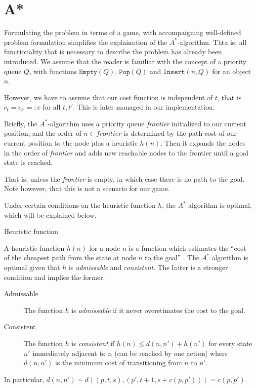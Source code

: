 \section{A*}

Formulating the problem in terms of a game, with accompaigning well-defined problem formulation simplifies the explaination of the $A^*$-algorithm. Thta is, all functionality that is necessary to describe the problem has already been introduced. We assume that the reader is familiar with the concept of a priority queue $Q$, with functions $\texttt{Empty}(Q)$, $\texttt{Pop}(Q)$ and $\texttt{Insert}(n, Q)$ for an object $n$.

However, we have to assume that our cost function is independent of $t$, that is $c_t = c_{t'} =: c$ for all $t, t'$. This is later managed in our implementation.

Briefly, the $A^*$-algorithm uses a priority queue \textit{frontier} initialized to our current position, and the order of $n\in \textit{frontier}$ is determined by the path-cost of our current position to the node plus a heuristic $h(n)$. Then it expands the nodes in the order of \textit{frontier} and adds new reachable nodes to the frontier until a goal state is reached.

That is, unless the \textit{frontier} is empty, in which case there is no path to the goal. Note however, that this is not a scenario for our game.

Under certain conditions on the heuristic function $h$, the $A^*$ algorithm is optimal, which will be explained below.

\begin{subsection}{Heuristic function}

  A heuristic function $h(n)$ for a node $n$ is a function which estimates the ``cost of the cheapest path from the state at node $n$ to the goal'' \cite{rn}. The $A^*$ algorithm is optimal given that $h$ is \emph{admissable} and \emph{consistent}. The latter is a stronger condition and implies the former.

\begin{description}
\item[Admissable] The function $h$ is \emph{admissable} if it never overstimates the cost to the goal.

\item[Consistent] The function $h$ is \emph{consistent} if $h(n) \leq d(n, n') + h(n')$ for every state $n'$ immediately adjacent to $n$ (can be reached by one action) where $d(n,n')$ is the minimum cost of transitioning from $n$ to $n'$.
\end{description}

In particular, $d(n, n') = d((p,t,s), (p', t+1, s+c(p,p'))) = c(p,p')$.

\end{subsection}

